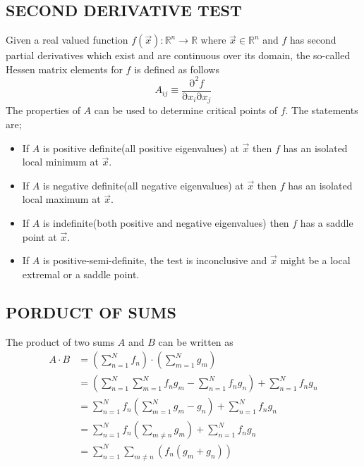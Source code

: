 \documentclass[a4paper, hidelinks, 10pt]{article}\usepackage[utf8]{inputenc}
\let\oldsubsection\subsection
\renewcommand{\subsection}[1]{\centering \oldsubsection{{#1}} \justifying}
\newcommand{\prtl}{\mathrm{\partial}} %
\newcommand{\rarr}{\rightarrow} %
\newcommand{\suml}[2]{\sum\limits_{#1=1}^{#2}}
\begin{document}
\subsection{SECOND DERIVATIVE TEST}
\label{sub:second_derivative_test}
    Given a real valued function $f(\vec{x}):\mathbb{R}^n\rarr\mathbb{R}$ where
    $\vec{x}\in\mathbb{R}^n$ and $f$ has second partial derivatives which exist
    and are continuous over its domain, the so-called Hessen matrix elements
    for $f$ is defined as follows \cite{linalgDavid}
        \begin{equation}
            A_{ij} \equiv \frac{\prtl^2f}{\prtl x_i\prtl x_j}
            \label{eq:hessendef}
        \end{equation}
    The properties of $A$ can be used to determine critical points of $f$. The
    statements are;
        \begin{itemize}
            \item If $A$ is positive definite(all positive eigenvalues) at
                $\vec{x}$ then $f$ has an isolated  local minimum at $\vec{x}$.
            \item If $A$ is negative definite(all negative eigenvalues) at
                $\vec{x}$ then $f$ has an isolated  local maximum at $\vec{x}$.
            \item If $A$ is indefinite(both positive and negative eigenvalues)
                then $f$ has a saddle point at $\vec{x}$.
            \item If $A$ is positive-semi-definite, the test is inconclusive
                and $\vec{x}$ might be a local extremal or a saddle point.
        \end{itemize}

\subsection{PORDUCT OF SUMS}
\label{sub:porduct_of_sums}
    The product of two sums $A$ and $B$ can be written as
        \begin{align}
            A\cdot B &= \left(\suml{n}{N} f_n\right)\cdot\left(\suml{m}{N}
            g_m\right) \nonumber \\
            &= \left(\suml{n}{N}\suml{m}{N}f_ng_m - \suml{n}{N}f_ng_n\right) +
            \suml{n}{N}f_ng_n \nonumber \\
            &= \suml{n}{N}f_n\left(\suml{m}{N}g_m-g_n\right) +
            \suml{n}{N}f_ng_n \nonumber \\
            &= \suml{n}{N}f_n\left(\sum\limits_{m\neq n}g_m\right) +
            \suml{n}{N}f_ng_n \nonumber \\
            &= \suml{n}{N}\sum\limits_{m\neq n}\left(f_n\left(g_m +
            g_n\right)\right)
            \label{eq:sumprod}
        \end{align}
\end{document}
